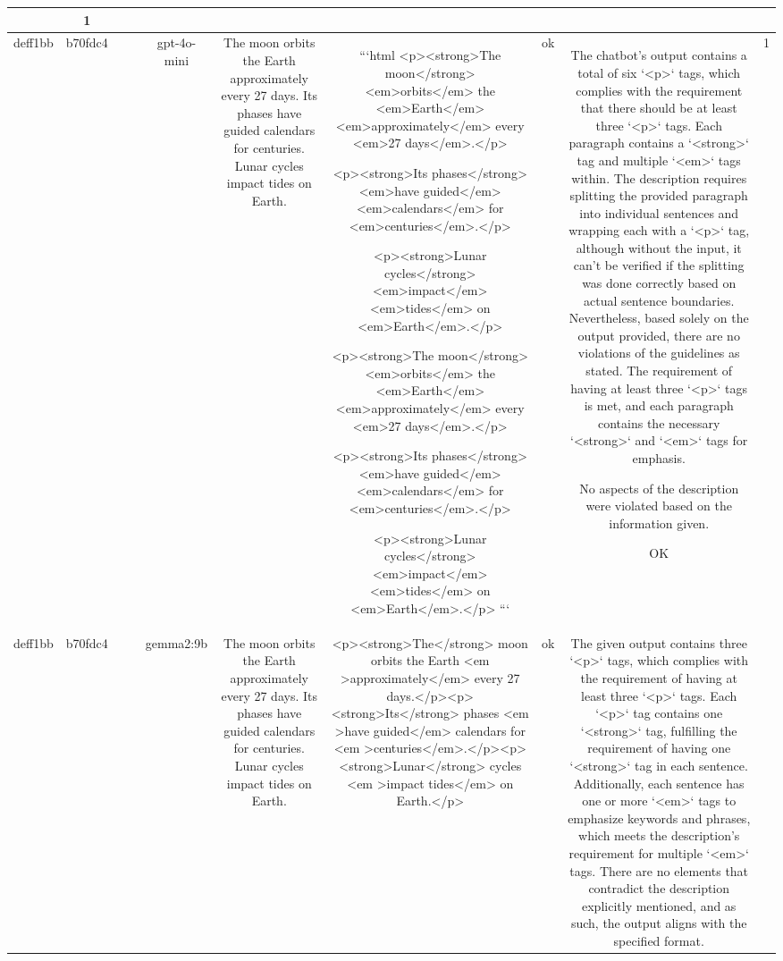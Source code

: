 \begin{table}[h!]
\begin{tabular}{|c|c|c|c|c|c|c|c|c|c|}
{{ERR & 1\\
\hline
deff1bb & b70fdc4 &  &  & gpt-4o-mini & The moon orbits the Earth approximately every 27 days. Its phases have guided calendars for centuries. Lunar cycles impact tides on Earth. & ```html
<p><strong>The moon</strong> <em>orbits</em> the <em>Earth</em> <em>approximately</em> every <em>27 days</em>.</p>

<p><strong>Its phases</strong> <em>have guided</em> <em>calendars</em> for <em>centuries</em>.</p>

<p><strong>Lunar cycles</strong> <em>impact</em> <em>tides</em> on <em>Earth</em>.</p>

<p><strong>The moon</strong> <em>orbits</em> the <em>Earth</em> <em>approximately</em> every <em>27 days</em>.</p>

<p><strong>Its phases</strong> <em>have guided</em> <em>calendars</em> for <em>centuries</em>.</p>

<p><strong>Lunar cycles</strong> <em>impact</em> <em>tides</em> on <em>Earth</em>.</p>
``` & ok & The chatbot's output contains a total of six `<p>` tags, which complies with the requirement that there should be at least three `<p>` tags. Each paragraph contains a `<strong>` tag and multiple `<em>` tags within. The description requires splitting the provided paragraph into individual sentences and wrapping each with a `<p>` tag, although without the input, it can't be verified if the splitting was done correctly based on actual sentence boundaries. Nevertheless, based solely on the output provided, there are no violations of the guidelines as stated. The requirement of having at least three `<p>` tags is met, and each paragraph contains the necessary `<strong>` and `<em>` tags for emphasis.

No aspects of the description were violated based on the information given.

OK & 1\\
\hline
deff1bb & b70fdc4 &  &  & gemma2:9b & The moon orbits the Earth approximately every 27 days. Its phases have guided calendars for centuries. Lunar cycles impact tides on Earth. & <p><strong>The</strong> moon orbits the Earth <em >approximately</em> every 27 days.</p><p><strong>Its</strong> phases <em >have guided</em> calendars for <em >centuries</em>.</p><p><strong>Lunar</strong> cycles <em >impact tides</em> on Earth.</p>  
 & ok & The given output contains three `<p>` tags, which complies with the requirement of having at least three `<p>` tags. Each `<p>` tag contains one `<strong>` tag, fulfilling the requirement of having one `<strong>` tag in each sentence. Additionally, each sentence has one or more `<em>` tags to emphasize keywords and phrases, which meets the description's requirement for multiple `<em>` tags. There are no elements that contradict the description explicitly mentioned, and as such, the output aligns with the specified format.

}}
\end{tabular}
\end{table}
